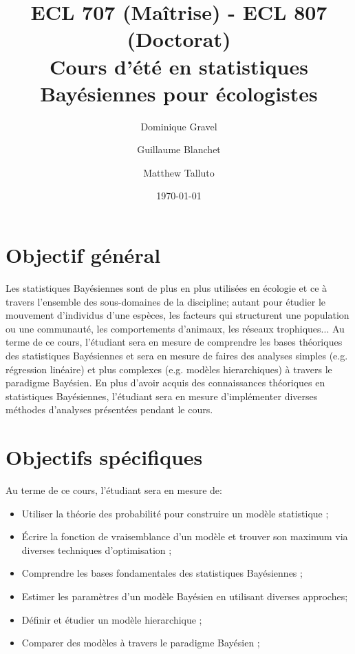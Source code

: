 \documentclass[12]{article}
\title{ECL 707 (Maîtrise) - ECL 807 (Doctorat) \\ Cours d'été en statistiques Bayésiennes pour écologistes}
\date {\today}
\author[1]{Dominique Gravel}
\author[1]{Guillaume Blanchet}
\author[2]{Matthew Talluto}
\affil[1]{Départment de biologie, Université de Sherbrooke}
\affil[2]{Laboratoire d'écologie Alpine, Université Grenoble 1}
\begin{document}
	\maketitle

	\section*{Objectif général}

  Les statistiques Bayésiennes sont de plus en plus utilisées en écologie et ce à
  travers l'ensemble des sous-domaines de la discipline; autant pour étudier le
  mouvement d'individus d'une espèces, les facteurs qui structurent une
  population ou une communauté, les comportements d'animaux, les réseaux
  trophiques... Au terme de ce cours, l'étudiant sera en mesure de comprendre
  les bases théoriques des statistiques Bayésiennes et sera en mesure de faires
  des analyses simples (e.g. régression linéaire) et plus complexes (e.g.
  modèles hierarchiques) à travers le paradigme Bayésien. En plus d'avoir acquis
  des connaissances théoriques en statistiques Bayésiennes, l'étudiant sera en
  mesure d'implémenter diverses méthodes d'analyses présentées pendant le cours.

	\section*{Objectifs spécifiques}

	Au terme de ce cours, l'étudiant sera en mesure de:

	\begin{itemize}
	\renewcommand{\labelitemi}{$\bullet$}

  \item Utiliser la théorie des probabilité pour construire un modèle statistique ;

  \item Écrire la fonction de vraisemblance d'un modèle et trouver son maximum via diverses techniques d'optimisation ;

  \item Comprendre les bases fondamentales des statistiques Bayésiennes ;

	\item Estimer les paramètres d'un modèle Bayésien en utilisant diverses approches;

	\item Définir et étudier un modèle hierarchique ;

	\item Comparer des modèles à travers le paradigme Bayésien ;

	\end{itemize}
\end{document}
